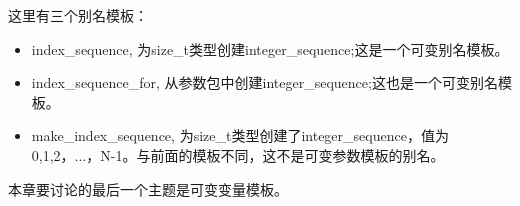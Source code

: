这里有三个别名模板：

\begin{itemize}
  \item index_sequence, 为size_t类型创建integer_sequence;这是一个可变别名模板。
  \item index_sequence_for, 从参数包中创建integer_sequence;这也是一个可变别名模板。
  \item make_index_sequence, 为size_t类型创建了integer_sequence，值为0,1,2，...，N-1。与前面的模板不同，这不是可变参数模板的别名。
\end{itemize}

本章要讨论的最后一个主题是可变变量模板。










